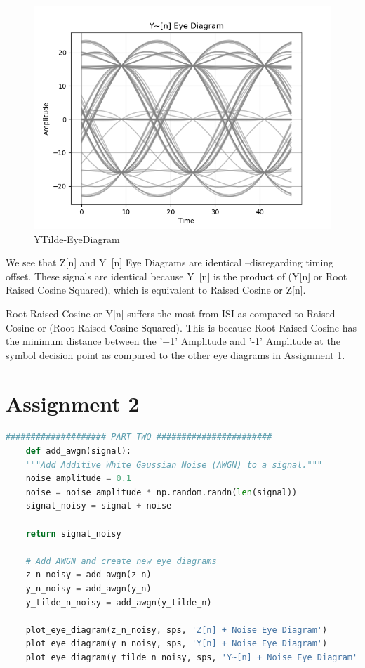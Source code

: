 \documentclass[
	letterpaper, %
	10pt, %
]{CSUniSchoolLabReport}
\begin{document}
\begin{figure}[H] %
	\centering %
	\includegraphics[width=1.2\textwidth]{assignment1c.png} %
	\caption{YTilde-EyeDiagram}
	\label{fig:block}
\end{figure}

We see that Z[n] and Y~[n] Eye Diagrams are identical --disregarding timing offset. These signals are identical because Y~[n] is the product of (Y[n] or Root Raised Cosine Squared), which is equivalent to Raised Cosine or Z[n].


Root Raised Cosine or Y[n] suffers the most from ISI as compared to Raised Cosine or (Root Raised Cosine Squared). This is because Root Raised Cosine has the minimum distance between the '+1' Amplitude and '-1' Amplitude at the symbol decision point as compared to the other eye diagrams in Assignment 1.

\section{Assignment 2}

\begin{lstlisting}[language=Python]
	#################### PART TWO #######################
	def add_awgn(signal):
	"""Add Additive White Gaussian Noise (AWGN) to a signal."""
	noise_amplitude = 0.1
	noise = noise_amplitude * np.random.randn(len(signal))
	signal_noisy = signal + noise
	
	return signal_noisy
	
	# Add AWGN and create new eye diagrams
	z_n_noisy = add_awgn(z_n)
	y_n_noisy = add_awgn(y_n)
	y_tilde_n_noisy = add_awgn(y_tilde_n)
	
	plot_eye_diagram(z_n_noisy, sps, 'Z[n] + Noise Eye Diagram')
	plot_eye_diagram(y_n_noisy, sps, 'Y[n] + Noise Eye Diagram')
	plot_eye_diagram(y_tilde_n_noisy, sps, 'Y~[n] + Noise Eye Diagram')
	
\end{lstlisting}
\end{document}
